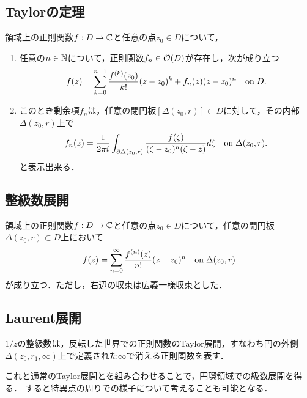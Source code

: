 \documentclass[uplatex, dvipdfmx]{jsreport}
\begin{document}
\subsection{Taylorの定理}

\begin{theorem}[Taylorの定理]
    領域上の正則関数$f:D\to\mathbb{C}$と任意の点$z_0\in D$について，
    \begin{enumerate}
        \item 任意の$n\in\mathbb{N}$について，正則関数$f_n\in\mathcal{O}(D)$が存在し，次が成り立つ
        \[f(z)=\sum^{n-1}_{k=0}\frac{f^{(k)}(z_0)}{k!}(z-z_0)^k+f_n(z)(z-z_0)^n\quad\mathrm{on}\; D.\]
        \item このとき剰余項$f_n$は，任意の閉円板$[\Delta(z_0,r)]\subset D$に対して，その内部$\Delta(z_0,r)$上で
        \[f_n(z)=\frac{1}{2\pi i}\int_{\partial\Delta(z_0,r)}\frac{f(\zeta)}{(\zeta-z_0)^n(\zeta-z)}d\zeta\quad\mathrm{on}\;\Delta(z_0,r).\]
        と表示出来る．
    \end{enumerate}
\end{theorem}

\subsection{整級数展開}

\begin{corollary}
    領域上の正則関数$f:D\to\mathbb{C}$と任意の点$z_0\in D$について，任意の開円板$\Delta(z_0,r)\subset D$上において
    \[f(z)=\sum^\infty_{n=0}\frac{f^{(n)}(z)}{n!}(z-z_0)^n\quad\mathrm{on}\;\Delta(z_0,r)\]
    が成り立つ．ただし，右辺の収束は広義一様収束とした．
\end{corollary}

\subsection{Laurent展開}

\begin{tcolorbox}[colframe=ForestGreen, colback=ForestGreen!10!white,breakable,colbacktitle=ForestGreen!40!white,coltitle=black,fonttitle=\bfseries\sffamily,
title=]
    $1/z$の整級数は，反転した世界での正則関数のTaylor展開，すなわち円の外側$\Delta(z_0,r_1,\infty)$上で定義された$\infty$で消える正則関数を表す．
    
    これと通常のTaylor展開とを組み合わせることで，円環領域での級数展開を得る．
    すると特異点の周りでの様子について考えることも可能となる．
\end{tcolorbox}
\end{document}
